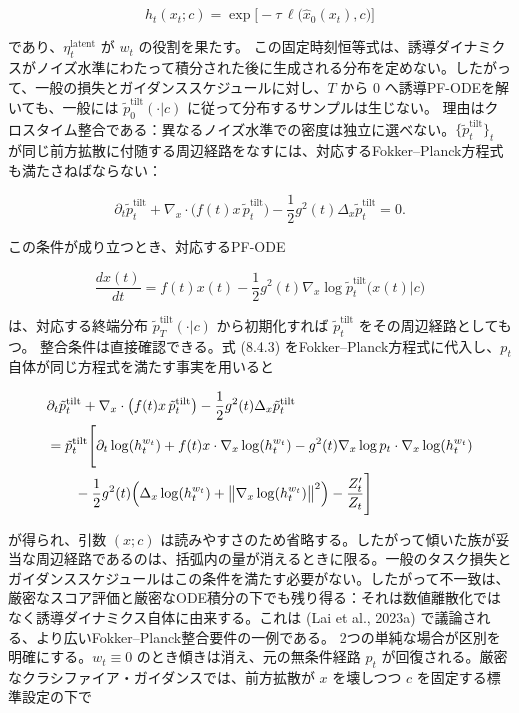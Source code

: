 \[
h_t(x_t;c)=\exp\bigl[-\tau\,\ell\bigl(\hat{x}_0(x_t),c\bigr)\bigr]
\]


であり、$\eta_t^{\mathrm{latent}}$ が $w_t$ の役割を果たす。
この固定時刻恒等式は、誘導ダイナミクスがノイズ水準にわたって積分された後に生成される分布を定めない。したがって、一般の損失とガイダンススケジュールに対し、$T$ から $0$ へ誘導PF-ODEを解いても、一般には $\tilde{p}_0^{\mathrm{tilt}}(\cdot|c)$ に従って分布するサンプルは生じない。
理由はクロスタイム整合である：異なるノイズ水準での密度は独立に選べない。$\{\tilde{p}_t^{\mathrm{tilt}}\}_t$ が同じ前方拡散に付随する周辺経路をなすには、対応するFokker–Planck方程式も満たさねばならない：

\[
\partial_t\tilde{p}_t^{\mathrm{tilt}}+\nabla_x\cdot\bigl(f(t)x\,\tilde{p}_t^{\mathrm{tilt}}\bigr)-\frac{1}{2}g^2(t)\Delta_x\tilde{p}_t^{\mathrm{tilt}}=0.
\]


この条件が成り立つとき、対応するPF-ODE

\[
\frac{dx(t)}{dt}=f(t)x(t)-\frac{1}{2}g^2(t)\nabla_x\log\tilde{p}_t^{\mathrm{tilt}}\bigl(x(t)|c\bigr)
\]


は、対応する終端分布 $\tilde{p}_T^{\mathrm{tilt}}(\cdot|c)$ から初期化すれば $\tilde{p}_t^{\mathrm{tilt}}$ をその周辺経路としてもつ。
整合条件は直接確認できる。式 (8.4.3) をFokker–Planck方程式に代入し、$p_t$ 自体が同じ方程式を満たす事実を用いると

\begin{align*}
\begin{aligned}
&\partial_t\tilde{p}_t^{\mathrm{tilt}}+\nabla_x\cdot\bigl(f(t)x\,\tilde{p}_t^{\mathrm{tilt}}\bigr)-\frac{1}{2}g^2(t)\Delta_x\tilde{p}_t^{\mathrm{tilt}} \\
&=\tilde{p}_t^{\mathrm{tilt}}\Biggl[
\partial_t\log(h_t^{w_t})+f(t)x\cdot\nabla_x\log(h_t^{w_t})-g^2(t)\nabla_x\log p_t\cdot\nabla_x\log(h_t^{w_t}) \\
&\qquad-\frac{1}{2}g^2(t)\Bigl(\Delta_x\log(h_t^{w_t})+\bigl\|\nabla_x\log(h_t^{w_t})\bigr\|^2\Bigr)-\frac{Z_t'}{Z_t}
\Biggr]
\end{aligned}
\end{align*}


が得られ、引数 $(x;c)$ は読みやすさのため省略する。したがって傾いた族が妥当な周辺経路であるのは、括弧内の量が消えるときに限る。一般のタスク損失とガイダンススケジュールはこの条件を満たす必要がない。したがって不一致は、厳密なスコア評価と厳密なODE積分の下でも残り得る：それは数値離散化ではなく誘導ダイナミクス自体に由来する。これは (Lai et al., 2023a) で議論される、より広いFokker–Planck整合要件の一例である。
2つの単純な場合が区別を明確にする。$w_t\equiv 0$ のとき傾きは消え、元の無条件経路 $p_t$ が回復される。厳密なクラシファイア・ガイダンスでは、前方拡散が $x$ を壊しつつ $c$ を固定する標準設定の下で

